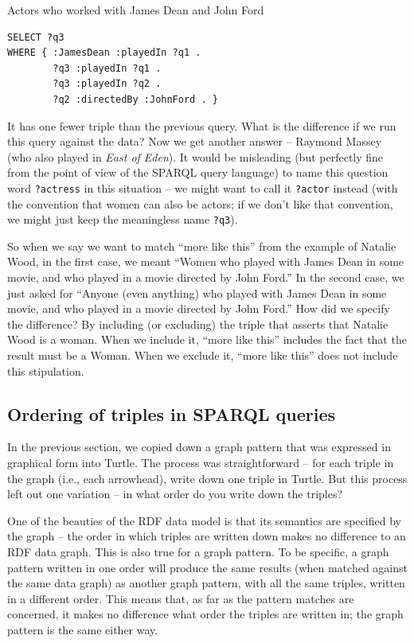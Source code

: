\begin{query}Actors who worked with James Dean and John Ford\end{query}
\begin{lstlisting}
SELECT ?q3
WHERE { :JamesDean :playedIn ?q1 .
        ?q3 :playedIn ?q1 .
        ?q3 :playedIn ?q2 .
        ?q2 :directedBy :JohnFord . }
\end{lstlisting}

It has one fewer triple than the previous query. What is the difference
if we run this query against the data? Now we get another answer --
Raymond Massey (who also played in \emph{East of Eden}). It would be
misleading (but perfectly fine from the point of view of the SPARQL
query language) to name this question word \texttt{?actress} in this situation --
we might want to call it \texttt{?actor} instead (with the convention that women
can also be actors; if we don't like that convention, we might just keep
the meaningless name \texttt{?q3}).

So when we say we want to match ``more like this'' from the example of
Natalie Wood, in the first case, we meant ``Women who played with James
Dean in some movie, and who played in a movie directed by John Ford.''
In the second case, we just asked for ``Anyone (even anything) who
played with James Dean in some movie, and who played in a movie directed
by John Ford.'' How did we specify the difference? By including (or
excluding) the triple that asserts that Natalie Wood is a woman. When we
include it, ``more like this'' includes the fact that the result must be
a Woman. When we exclude it, ``more like this'' does not include this
stipulation.

\subsection{Ordering of triples in SPARQL queries}

In the previous section, we copied down a graph pattern that was
expressed in graphical form into Turtle. The process was straightforward
-- for each triple in the graph (i.e., each arrowhead), write down one
triple in Turtle. But this process left out one variation -- in what
order do you write down the triples?

One of the beauties of the RDF data model is that its semantics are
specified by the graph -- the order in which triples are written down
makes no difference to an RDF data graph. This is
also true for a graph pattern. To be specific, a graph pattern written
in one order will produce the same results (when matched against the
same data graph) as another graph pattern, with all the same triples,
written in a different order. This means that, as far as the pattern
matches are concerned, it makes no difference what order the triples are
written in; the graph pattern is the same either way.

